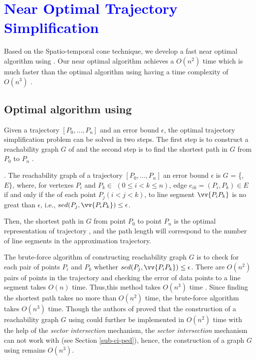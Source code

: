 \section{\textcolor{blue}{Near Optimal Trajectory Simplification}}
\label{sec-optimal}

Based on the Spatio-temporal cone technique, we develop a fast near optimal algorithm using \sed. Our near optimal algorithm achieves a $O(n^2)$ time which is much faster than the optimal algorithm using \sed having a time complexity of $O(n^3)$ \cite{Imai:Optimal}.


\subsection{Optimal algorithm using \sed}

Given a trajectory ${[P_0, \ldots, P_n]}$ and an error bound $\epsilon$, the optimal trajectory simplification problem can be solved in two steps. 
The first step is to construct a reachability graph $G$ of  and the second step is to find the shortest path in $G$ from $P_0$ to $P_{n}$ \cite{Imai:Optimal, Chan:Optimal}.

. The reachability graph of a trajectory ${[P_0, \ldots, P_n]}$ \wrt an error bound $\epsilon$ is $G$
= \{, $E\}$, where, for vertexes $P_i$ and $P_k \in$  $(0 \le i<k\le n)$, edge $e_{ik}=(P_i, P_k) \in E$ if and only if the \sed of each point $P_j (i<j<k)$, to line segment $\vv{P_iP_k}$ is no great than $\epsilon$, i.e., $sed(P_j, \vv{P_iP_k}) \le \epsilon$.

Then, the shortest path in $G$ from point $P_0$ to point $P_{n}$ is the optimal representation of trajectory , and the path length will correspond to the number of line segments in the approximation trajectory. 


The brute-force algorithm of constructing reachability graph $G$ is to check for each pair of points $P_i$ and $P_k$ whether $sed(P_j, \vv{P_iP_k}) \le \epsilon$. 
There are $O(n^2)$ pairs of points in the trajectory and checking the error of data points to a line segment takes $O(n)$ time. 
Thus,this method takes $O(n^3)$ time \cite{Imai:Optimal}. 
Since finding the shortest path takes no more than $O(n^2)$ time, the brute-force algorithm takes $O(n^3)$ time.
%
Though the authors of \cite{Chan:Optimal} proved that the construction of a reachability graph $G$ using \ped could further be implemented in $O(n^2)$ time with the help of the \textit{sector intersection} mechanism, the \textit{sector intersection} mechanism can not work with \sed (see Section \ref{sub-ci-ped}), hence, the construction of a graph  $G$ using \sed remains $O(n^3)$.

